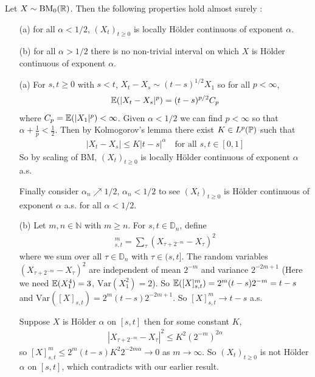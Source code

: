 \documentclass[12pt,a4paper]{report}
\newenvironment{proof}
{\begin{changemargin}{1cm}{0.5cm} 
	}%
	{\end{changemargin}
}
\begin{document}
 Let $X \sim \text{BM}_0(\mathbb{R})$. Then the following properties hold almost surely : 
\begin{itemize}
\item[(a)] for all $\alpha < 1/2$, $(X_t)_{t\geq 0}$ is locally H\"{o}lder continuous of exponent $\alpha$.
\item[(b)] for all $\alpha >1/2$ there is no non-trivial interval on which $X$ is H\"{o}lder continuous of exponent $\alpha$.
\end{itemize}
\begin{proof}
\pf \begin{itemize}
\item[(a)] For $s,t\geq 0$ with $s<t$, $X_t - X_s \sim (t-s)^{1/2} X_1$ so for all $p< \infty$,
\begin{align*}
\mathbb{E}( |X_t-X_s|^p ) = (t-s)^{p/2} C_p
\end{align*}
where $C_p = \mathbb{E}( |X_1|^p ) < \infty$. Given $\alpha < 1/2$ we can find $p<\infty$ so that $\alpha + \frac{1}{p} < \frac{1}{2}$. Then by Kolmogorov's lemma there exist $K\in L^p(\mathbb{P})$ such that
\begin{align*}
|X_t - X_s| \leq K|t-s|^{\alpha} \quad \text{for all } s,t\in [0,1]
\end{align*}
So by scaling of BM, $(X_t)_{t\geq 0}$ is locally H\"{o}lder continuous of exponent $\alpha$ a.s.

\quad Finally consider $\alpha_n \nearrow 1/2$, $\alpha_n < 1/2$ to see $(X_t)_{t\geq 0}$ is H\"{o}lder continuous of exponent $\alpha$ a.s. for all $\alpha <1/2$.
\item[(b)] Let $m,n\in \mathbb{N}$ with $m\geq n$. For $s,t\in \mathbb{D}_n$, define
\begin{align*}
[X]^m_{s,t} = \sum_{\tau} (X_{\tau + 2^{-m}} -X_{\tau})^2
\end{align*}
where we sum over all $\tau \in \mathbb{D}_n$ with $\tau \in (s,t]$. The random variables $(X_{\tau + 2^{-m}} - X_{\tau})^2$ are independent of mean $2^{-m}$ and variance $2^{-2m +1}$ (Here we need $\mathbb{E}(X_1^4)=3$, $\text{Var}(X_1^2)=2$). So $\mathbb{E}([X]_{s,t}^m) = 2^m (t-s) 2^{-m} =t-s$ and $\text{Var}([X]_{s,t}) = 2^m (t-s)2^{-2m+1}$. So $[X]_{s,t}^m \rightarrow t-s$ a.s.

\quad Suppose $X$ is H\"{o}lder $\alpha$ on $[s,t]$ then for some constant $K$, 
\begin{align*}
|X_{\tau + 2^{-m}} - X_{\tau}|^2 \leq K^2 (2^{-m})^{2\alpha}
\end{align*}
so $[X]^{m}_{s,t} \leq 2^m (t-s) K^2 2^{-2m\alpha} \rightarrow 0$ as $m\rightarrow \infty$. So $(X_t)_{t\geq 0}$ is not H\"{o}lder $\alpha$ on $[s,t]$, which contradicts with our earlier result.
\end{itemize}

\eop
\end{proof}
\s
\end{document}
